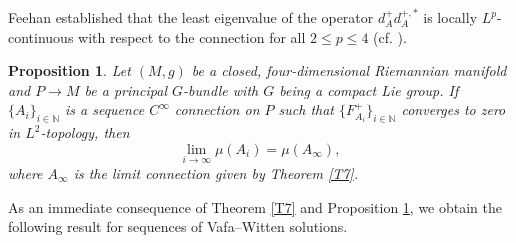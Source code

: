 \documentclass[12pt, twoside]{article}
\newtheorem{proposition}[theorem]{Proposition}
\theoremstyle{definition}
\numberwithin{equation}{section}
\def \N {\mathbb{N}}
\begin{document}
Feehan established that the least eigenvalue of the operator $d_{A}^{+}d_{A}^{+,\ast}$ is locally $L^{p}$-continuous with respect to the connection for all $2\leq p\leq 4$ (cf. \cite[Proposition A.3]{Fee16}). 

\begin{proposition}\label{P7}
	Let $(M,g)$ be a closed, four-dimensional Riemannian manifold and $P\rightarrow M$ be a principal $G$-bundle with $G$ being a compact Lie group.
	 If $\{A_{i}\}_{i\in\mathbb{N}}$ is a sequence $C^{\infty}$ connection on $P$ such that $\{F^{+}_{A_{i}}\}_{i\in\N}$ converges to zero in $L^{2}$-topology,
	  then
$$\lim_{i\rightarrow\infty}\mu(A_{i})=\mu(A_{\infty}),$$
where $A_{\infty}$ is the limit connection given by Theorem \ref{T7}.
\end{proposition} 

As an immediate consequence of Theorem \ref{T7} and Proposition \ref{P7}, we obtain the following result for sequences of Vafa--Witten solutions.
\end{document}
